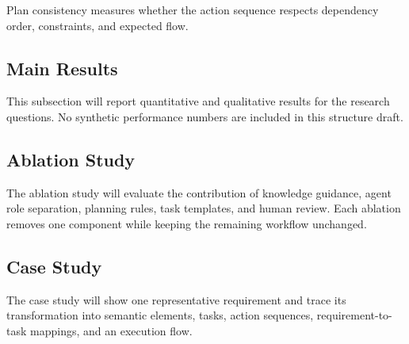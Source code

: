 Plan consistency measures whether the action sequence respects dependency order, constraints, and expected flow.

\subsection{Main Results}
\label{sec:exp-results}

This subsection will report quantitative and qualitative results for the research questions.
No synthetic performance numbers are included in this structure draft.

\subsection{Ablation Study}
\label{sec:exp-ablation}

The ablation study will evaluate the contribution of knowledge guidance, agent role separation, planning rules, task templates, and human review.
Each ablation removes one component while keeping the remaining workflow unchanged.

\subsection{Case Study}
\label{sec:exp-case}

The case study will show one representative requirement and trace its transformation into semantic elements, tasks, action sequences, requirement-to-task mappings, and an execution flow.

